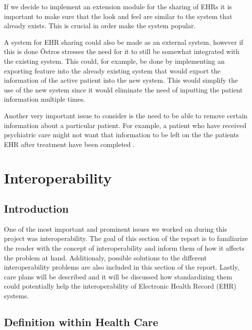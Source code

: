 \documentclass[14pt]{article}
\begin{document}
If we decide to implement an extension module for the sharing of EHRs it is important to make sure that the look and feel are similar to the system that already exists. This is crucial in order make the system popular. 

A system for EHR sharing could also be made as an external system, however if this is done Östros\cite{EPJ2} stresses the need for it to still be somewhat integrated with the existing system. This could, for example, be done by implementing an exporting feature into the already existing system that would export the information of the active patient into the new system. This would simplify the use of the new system since it would eliminate the need of inputting the patient information multiple times.

Another very important issue to consider is the need to be able to remove certain information about a particular patient. For example, a patient who have received psychiatric care might not want that information to be left on the the patients EHR after treatment have been completed \cite{EPJ1}.


\newpage

\section{Interoperability}
\label{sec:Interoperability}

\subsection{Introduction} 
\label{sec:interopIntro}
One of the most important and prominent issues we worked on during this project was interoperability. The goal of this section of the report is to familiarize the reader with the concept of interoperability and inform them of how it affects the problem at hand. Additionaly, possible solutions to the different interoperability problems are also included in this section of the report.  Lastly, care plans will be described and it will be discussed how standardizing them could potentially help the interoperability of Electronic Health Record (EHR) systems.

\subsection{Definition within Health Care} 
\label{sec:interopDefinition}

\end{document}
